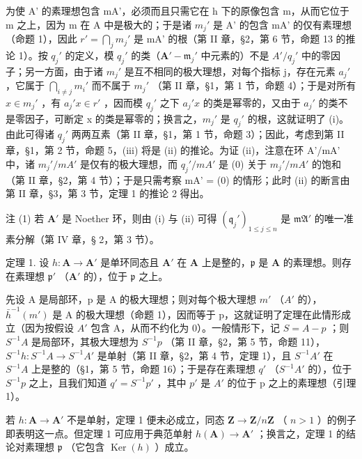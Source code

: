 为使 A' 的素理想包含 mA'，必须而且只需它在 h 下的原像包含 m，从而它位于 m 之上，因为 m 在 A 中是极大的；于是诸 \(m_{j}'\) 是 A' 的包含 mA' 的仅有素理想（命题 1），因此 \(r' = \bigcap_{j} m_{j}'\) 是 mA' 的根（第 II 章，§2，第 6 节，命题 13 的推论 1）。按 \(q_{j}'\) 的定义，模 \(q_{j}'\) 的类（\(\mathbf{A}' - \mathfrak{m}_{j}'\) 中元素的）不是 \(A'/q_{j}'\) 中的零因子；另一方面，由于诸 \(m_{j}'\) 是互不相同的极大理想，对每个指标 j，存在元素 \(a_{j}'\) ，它属于 \(\bigcap_{i \neq j} m_{i}'\) 而不属于 \(m_{j}'\) （第 II 章，§1，第 1 节，命题 4）；于是对所有 \(x \in m_{j}'\) ，有 \(a_{j}'x \in r'\) ，因而模 \(q_{j}'\) 之下 \(a_{j}'x\) 的类是幂零的，又由于 \(a_{j}'\) 的类不是零因子，可断定 x 的类是幂零的；换言之，\(m_{j}'\) 是 \(q_{j}'\) 的根，这就证明了 (i)。由此可得诸 \(q_{j}'\) 两两互素（第 II 章，§1，第 1 节，命题 3）；因此，考虑到第 II 章，§1，第 2 节，命题 5，(iii) 将是 (ii) 的推论。为证 (ii)，注意在环 A'/mA' 中，诸 \(m_{j}'/mA'\) 是仅有的极大理想，而 \(q_{j}'/mA'\) 是 (0) 关于 \(m_{j}'/mA'\) 的饱和（第 II 章，§2，第 4 节）；于是只需考察 mA' = (0) 的情形；此时 (ii) 的断言由第 II 章，§3，第 3 节，定理 1 的推论 2 得出。

注 (1) 若 \(\mathbf{A}'\) 是 Noether 环，则由 (i) 与 (ii) 可得 \((\mathfrak{q}_j')_{1 \leqslant j \leqslant n}\) 是 \(\mathfrak{mA}'\) 的唯一准素分解（第 IV 章，§ 2，第 3 节）。

定理 1. 设 \(h: \mathbf{A} \to \mathbf{A}'\) 是单环同态且 \(\mathbf{A}'\) 在 \(\mathbf{A}\) 上是整的，\(\mathfrak{p}\) 是 \(\mathbf{A}\) 的素理想。则存在素理想 \(\mathfrak{p}'\) （\(\mathbf{A}'\) 的），位于 \(\mathfrak{p}\) 之上。

先设 A 是局部环，p 是 A 的极大理想；则对每个极大理想 \(m'\) （\(A'\) 的），\(\bar{h}^{-1}(m')\) 是 A 的极大理想（命题 1），因而等于 p，这就证明了定理在此情形成立（因为按假设 \(A'\) 包含 A，从而不约化为 0）。一般情形下，记 \(S = A - p\) ；则 \(S^{-1}A\) 是局部环，其极大理想为 \(S^{-1}p\) （第 II 章，§2，第 5 节，命题 11），\(S^{-1}h: S^{-1}A \to S^{-1}A'\) 是单射（第 II 章，§2，第 4 节，定理 1），且 \(S^{-1}A'\) 在 \(S^{-1}A\) 上是整的（§1，第 5 节，命题 16）；于是存在素理想 \(q'\) （\(S^{-1}A'\) 的），位于 \(S^{-1}p\) 之上，且我们知道 \(q' = S^{-1}p'\) ，其中 \(p'\) 是 \(A'\) 的位于 p 之上的素理想（引理 1）。

若 \(h: \mathbf{A} \to \mathbf{A}'\) 不是单射，定理 1 便未必成立，同态 \(\mathbf{Z} \to \mathbf{Z}/n\mathbf{Z}\) （ \(n > 1\) ）的例子即表明这一点。但定理 1 可应用于典范单射 \(h(\mathbf{A}) \to \mathbf{A}'\) ；换言之，定理 1 的结论对素理想 \(\mathfrak{p}\) （它包含 \(\operatorname{Ker}(h)\) ）成立。

